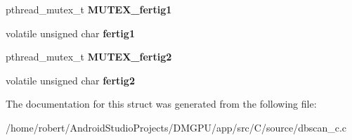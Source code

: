 \begin{DoxyCompactItemize}
pthread\+\_\+mutex\+\_\+t {\bfseries M\+U\+T\+E\+X\+\_\+fertig1}
\item 
\mbox{\label{structdbscan__pt_a8ce1ed79a8f30b769dbae5a3725d0bec}} 
volatile unsigned char {\bfseries fertig1}
\item 
\mbox{\label{structdbscan__pt_ade6e5b96f996f1d367a2595f7c237978}} 
pthread\+\_\+mutex\+\_\+t {\bfseries M\+U\+T\+E\+X\+\_\+fertig2}
\item 
\mbox{\label{structdbscan__pt_a6e02721843281f1f83499d2e7c3ffd32}} 
volatile unsigned char {\bfseries fertig2}
\end{DoxyCompactItemize}


The documentation for this struct was generated from the following file\+:\begin{DoxyCompactItemize}
\item 
/home/robert/\+Android\+Studio\+Projects/\+D\+M\+G\+P\+U/app/src/\+C/source/dbscan\+\_\+c.\+c\end{DoxyCompactItemize}
